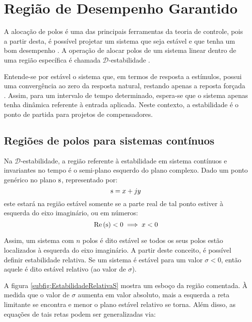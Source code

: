 \chapter{Região de Desempenho Garantido}

A alocação de polos é uma das principais ferramentas da teoria de controle, pois a partir desta, é possível projetar um sistema que seja estável e que tenha um bom desempenho . A operação de alocar polos de um sistema linear dentro de uma região específica é chamada $\mathscr{D}$-estabilidade .

Entende-se por estável o sistema que, em termos de resposta a estímulos, possui uma convergência ao zero da resposta natural, restando apenas a reposta forçada \cite{NISE2011}. Assim, para um intervalo de tempo determinado, espera-se que o sistema apenas tenha dinâmica referente à entrada aplicada. Neste contexto, a estabilidade é o ponto de partida para projetos de compensadores.

\section{Regiões de polos para sistemas contínuos}\label{sec:DEstabilidadeS}

Na $\mathscr{D}$-estabilidade, a região referente à estabilidade em sistema contínuos e invariantes no tempo é o semi-plano esquerdo do plano complexo. Dado um ponto genérico no plano $\operatorname{\mathrm{s}}$, representado por:
\begin{equation}
  \operatorname{\mathrm{s}} = x + jy\label{eq:PontoGenericoPlanoS}
\end{equation}
este estará na região estável somente se a parte real de tal ponto estiver à esquerda do eixo imaginário, ou em números:
\begin{equation}
  \operatorname{Re}{(\operatorname{\mathrm{s}})} < 0 \implies x < 0 \label{eq:Estabilidade}
\end{equation}

Assim, um sistema com $n$ polos é dito estável se todos os seus polos estão localizados à esquerda do eixo imaginário. A partir deste conceito, é possível definir estabilidade relativa. Se um sistema é estável para um valor $\sigma < 0$, então aquele é dito estável relativo (ao valor de $\sigma$).

A figura \ref{subfig:EstabilidadeRelativaS} mostra um esboço da região comentada. À medida que o valor de $\sigma$ aumenta em valor absoluto, mais a esquerda a reta limitante se encontra e menor o plano estável relativo se torna. Além disso, as equações de tais retas podem ser generalizadas via:

